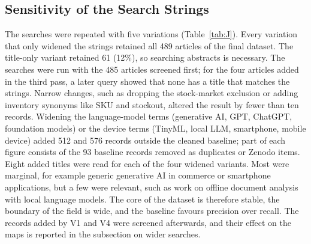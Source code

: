 \subsection{Sensitivity of the Search Strings}
The searches were repeated with five variations (Table~\ref{tab:J}). Every variation that only widened the strings retained all 489 articles of the final dataset. The title-only variant retained 61 (12\%), so searching abstracts is necessary. The searches were run with the 485 articles screened first; for the four articles added in the third pass, a later query showed that none has a title that matches the strings. Narrow changes, such as dropping the stock-market exclusion or adding inventory synonyms like SKU and stockout, altered the result by fewer than ten records. Widening the language-model terms (generative AI, GPT, ChatGPT, foundation models) or the device terms (TinyML, local LLM, smartphone, mobile device) added 512 and 576 records outside the cleaned baseline; part of each figure consists of the 93 baseline records removed as duplicates or Zenodo items. Eight added titles were read for each of the four widened variants. Most were marginal, for example generic generative AI in commerce or smartphone applications, but a few were relevant, such as work on offline document analysis with local language models. The core of the dataset is therefore stable, the boundary of the field is wide, and the baseline favours precision over recall. The records added by V1 and V4 were screened afterwards, and their effect on the maps is reported in the subsection on wider searches.


